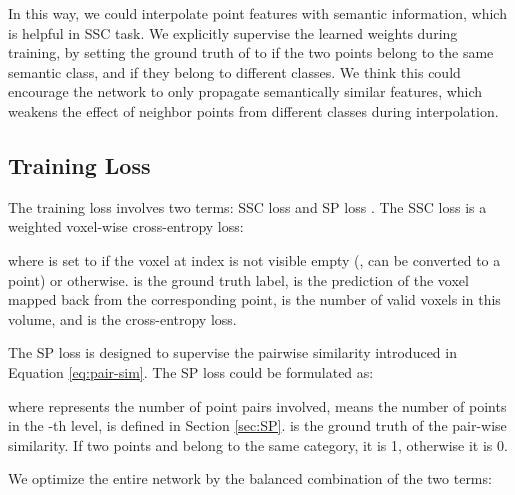 In this way, we could interpolate point features with semantic information, which is helpful in SSC task.
We explicitly supervise the learned weights during training, 
by setting the ground truth of  to  if the two points belong to the same semantic class, and  if they belong to different classes.
We think this could encourage the network to only propagate semantically similar features, which weakens the effect of neighbor points from different classes during interpolation.



\subsection{Training Loss}


The training loss involves two terms: SSC loss  and SP loss .
The SSC loss is a weighted voxel-wise cross-entropy loss:

where  is set to  if the voxel at index  is not visible empty (\ie, can be converted to a point) or  otherwise. 
 is the ground truth label,
 is the prediction of the voxel mapped back from the corresponding point,
 is the number of valid voxels in this volume, 
and  is the cross-entropy loss.


The SP loss is designed to supervise the pairwise similarity introduced in Equation \ref{eq:pair-sim}. The SP loss could be formulated as:


where  represents the number of point pairs involved,  means the number of points in the -th level, 
 is defined in Section \ref{sec:SP}. 
 is the ground truth of the pair-wise similarity. If two points  and  belong to the same category, it is 1, otherwise it is 0.

We optimize the entire network by the balanced combination of the two terms:



